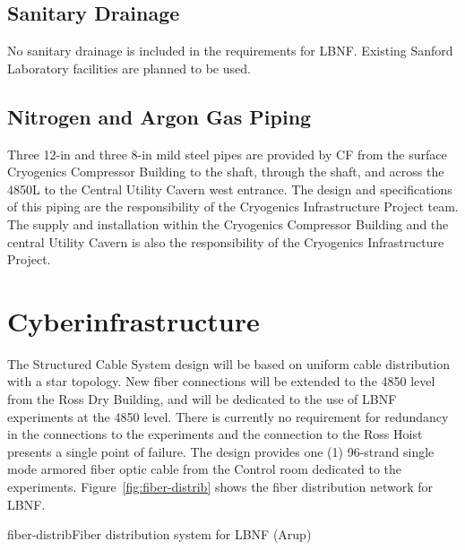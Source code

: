\subsection{Sanitary Drainage}
\label{sec:fscf-und-san-drain}

No sanitary drainage is included in the requirements for LBNF.  Existing Sanford Laboratory facilities are planned to be used.

\subsection{Nitrogen and Argon Gas Piping}
\label{sec:fscf-und-gas-piping}

Three 12-in and three 8-in mild steel pipes are provided by CF from the surface Cryogenics Compressor Building to the shaft, through the shaft, and across the 4850L to the Central Utility Cavern west entrance.  The design and specifications of this piping are the responsibility of the Cryogenics Infrastructure Project team. The supply and installation within the Cryogenics Compressor Building and the central Utility Cavern is also the responsibility of the Cryogenics Infrastructure Project.


\section{Cyberinfrastructure}
\label{sec:fscf-und-cyber}

The Structured Cable System design will be based on uniform cable distribution with a star topology. New fiber connections will be extended to the 4850 level from the Ross Dry Building, and will be dedicated to the use of LBNF experiments at the 4850 level. There is currently no requirement for redundancy in the connections to the experiments and the connection to the Ross Hoist presents a single point of failure. The design provides one (1) 96-strand single mode armored fiber optic cable from the Control room dedicated to the experiments.  Figure~\ref{fig:fiber-distrib} shows the fiber distribution network for LBNF.

\begin{cdrfigure}{fiber-distrib}{Fiber distribution system for LBNF (Arup)}
\end{cdrfigure}

